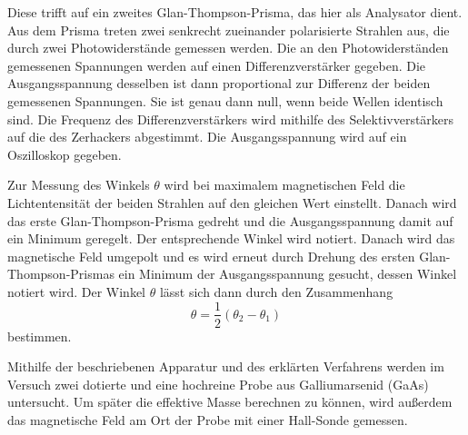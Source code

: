 Diese trifft auf ein zweites Glan-Thompson-Prisma, das hier als Analysator dient.
Aus dem Prisma treten zwei senkrecht zueinander polarisierte Strahlen aus, die durch zwei
Photowiderstände gemessen werden. Die an den Photowiderständen
gemessenen Spannungen werden auf einen Differenzverstärker gegeben. Die Ausgangsspannung
desselben ist dann proportional zur Differenz der beiden gemessenen Spannungen. Sie
ist genau dann null, wenn beide Wellen identisch sind. Die Frequenz des Differenzverstärkers
wird  mithilfe des Selektivverstärkers auf die des Zerhackers abgestimmt. Die Ausgangsspannung
wird auf ein Oszilloskop gegeben.

Zur Messung des Winkels $\theta$ wird bei maximalem magnetischen Feld die Lichtentensität
der beiden Strahlen auf den gleichen Wert einstellt. Danach wird das erste Glan-Thompson-Prisma
gedreht und die Ausgangsspannung damit auf ein Minimum geregelt. Der entsprechende
Winkel wird notiert. Danach wird das magnetische Feld umgepolt und es wird erneut
durch Drehung des ersten Glan-Thompson-Prismas ein Minimum der Ausgangsspannung gesucht,
dessen Winkel notiert wird. Der Winkel $\theta$ lässt sich dann durch den Zusammenhang
\begin{equation}
  \theta  = \frac{1}{2} (\theta_2 - \theta_1)
\label{eqn:drehwinkel}
\end{equation}
bestimmen.
\cite{Bitte theta2 und theta1 erklären.}

Mithilfe der beschriebenen Apparatur und des erklärten Verfahrens werden im Versuch zwei dotierte
und eine hochreine Probe aus Galliumarsenid (GaAs) untersucht. Um später die effektive Masse berechnen zu
können, wird außerdem das magnetische Feld am Ort der Probe mit einer Hall-Sonde gemessen.
